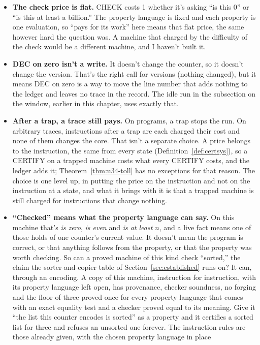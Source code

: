 \documentclass[11pt,twoside]{article}
\theoremstyle{thielethm}
\theoremstyle{thieledef}
\theoremstyle{thieledef}
\theoremstyle{thieledef}
\theoremstyle{thielethm}
\theoremstyle{thieleobs}
\theoremstyle{thielethm}
\begin{document}
\begin{itemize}
\item \textbf{The check price is flat.} CHECK costs 1 whether it's asking ``is this 0'' or ``is this at
least a billion.'' The property language is fixed and each property is one evaluation, so
``pays for its work'' here means that flat price, the same however hard the
question was. A machine that charged by the difficulty of the check would be a different
machine, and I haven't built it.
\item \textbf{DEC on zero isn't a write.} It doesn't change the counter, so it doesn't change the
version. That's the right call for versions (nothing changed), but it means DEC on zero is
a way to move the line number that adds nothing to the ledger and leaves no trace in the record. The idle run in the
subsection on the window, earlier in this chapter, uses exactly that.
\item \textbf{After a trap, a trace still pays.} On programs, a trap stops the run. On arbitrary
traces, instructions after a trap are each charged their cost and none of them changes the
core. That isn't a separate choice. A price belongs to the instruction, the same from every state
(Definition~\ref{def:certsys}), so a CERTIFY on a trapped machine costs what every CERTIFY costs, and
the ledger adds it; Theorem~\ref{thm:u34-toll}
has no exceptions for that reason. The choice is one level up, in putting the price on the instruction and
not on the instruction at a state, and what it brings with it is that a trapped
machine is still charged for instructions that change nothing.
\item \textbf{``Checked'' means what the property language can say.} On this machine that's \emph{is
zero}, \emph{is even} and \emph{is at least $n$}, and a live fact means one of those holds of one counter's
current value. It doesn't mean the program is correct, or that anything follows from the
property, or that the property was worth checking. So can a proved machine of this kind check
``sorted,'' the claim the sorter-and-copier table of Section~\ref{sec:established} runs on? It can, through an encoding. A copy of
this machine, instruction for instruction, with its property language left open, has provenance,
checker soundness, no forging and the floor of three proved once for every property language that
comes with an exact equality test and a checker proved equal to its meaning. Give it ``the list
this counter encodes is sorted'' as a property and it certifies a sorted list for three and
refuses an unsorted one forever. The instruction rules are those already given, with the chosen property language in place

\end{itemize}
\end{document}
